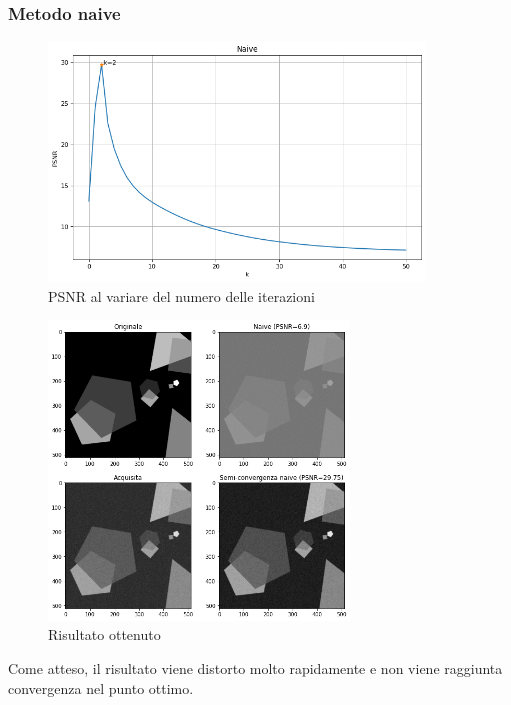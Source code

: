 \documentclass[11pt]{article}
\begin{document}
\subsubsection{Metodo naive}
\begin{figure}[H]
    \centering
    \includegraphics[width=10cm]{semiconvergenza/1/psnr_naive.png}
    \caption{PSNR al variare del numero delle iterazioni}
    \label{fig:semiconv_psnr_naive1}
\end{figure}
\begin{figure}[H]
    \centering
    \includegraphics[width=8cm]{semiconvergenza/1/deblur_naive.png}
    \caption{Risultato ottenuto}
    \label{fig:semiconv_deblur_naive1}
\end{figure}
Come atteso, il risultato viene distorto molto rapidamente e non viene raggiunta convergenza nel punto ottimo.
\end{document}
